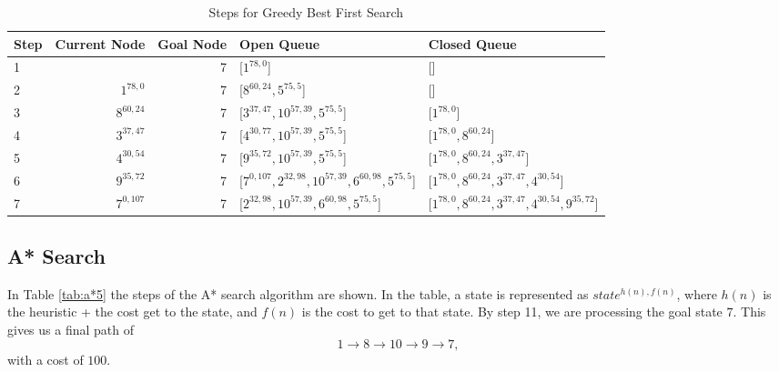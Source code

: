 \documentclass{article}
\begin{document}
    \begin{table}[!htp]\centering
        \caption{Steps for Greedy Best First Search}\label{tab:gbfs5}
        \scriptsize
        \begin{tabular}{lrrll}\toprule
        Step &Current Node &Goal Node & Open Queue &Closed Queue  \\\midrule
        1&  &7 &[$1^{78,0}$] &[] \\
        2& $1^{78,0}$ &7 &[$8^{60,24}, 5^{75,5}$] &[] \\
        3& $8^{60,24}$ &7 &[$3^{37,47}, 10^{57, 39}, 5^{75,5}$] &[$1^{78,0}$] \\
        4& $3^{37,47}$ &7 &[$4^{30, 77}, 10^{57, 39}, 5^{75,5}$] &[$1^{78,0}, 8^{60,24}$] \\
        5& $4^{30,54}$ &7 &[$9^{35, 72}, 10^{57,39}, 5^{75,5}$] &[$1^{78,0}, 8^{60,24}, 3^{37,47}$] \\
        6& $9^{35,72}$ &7 &[$7^{0, 107}, 2^{32, 98}, 10^{57,39}, 6^{60, 98}, 5^{75,5}$] &[$1^{78,0}, 8^{60,24}, 3^{37,47}, 4^{30,54}$] \\
        7& $7^{0,107}$ &7 &[$2^{32, 98}, 10^{57,39}, 6^{60, 98}, 5^{75,5}$] &[$1^{78,0}, 8^{60,24}, 3^{37,47}, 4^{30,54}, 9^{35,72}$] \\
        \end{tabular}
    \end{table}


\subsection{A* Search}

    In Table \ref{tab:a*5} the steps of the A* search algorithm are shown. In the table, a state is represented as $state^{h(n), f(n)}$, where $h(n)$ is the heuristic + the cost get to the state, and $f(n)$ is the cost to get to that state.
    By step 11, we are processing the goal state $7$. This gives us a final path of
    \begin{equation}
        1 \rightarrow 8 \rightarrow 10 \rightarrow 9 \rightarrow 7,
    \end{equation}
    with a cost of $100$.
\end{document}
